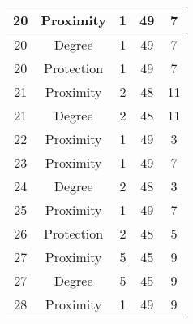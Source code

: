 \documentclass[results.tex]{subfiles}
\begin{document}
\begin{center}
\begin{tabular}{| c || c | c | c | c |}
            \hline
            20                      & Proximity                    & 1                      & 49                      & 7                    \\
            \hline
            20                      & Degree                       & 1                      & 49                      & 7                    \\
            \hline
            20                      & Protection                   & 1                      & 49                      & 7                    \\
            \hline
            21                      & Proximity                    & 2                      & 48                      & 11                   \\
            \hline
            21                      & Degree                       & 2                      & 48                      & 11                   \\
            \hline
            22                      & Proximity                    & 1                      & 49                      & 3                    \\
            \hline
            23                      & Proximity                    & 1                      & 49                      & 7                    \\
            \hline
            24                      & Degree                       & 2                      & 48                      & 3                    \\
            \hline
            25                      & Proximity                    & 1                      & 49                      & 7                    \\
            \hline
            26                      & Protection                   & 2                      & 48                      & 5                    \\
            \hline
            27                      & Proximity                    & 5                      & 45                      & 9                    \\
            \hline
            27                      & Degree                       & 5                      & 45                      & 9                    \\
            \hline
            28                      & Proximity                    & 1                      & 49                      & 9                    \\

\end{tabular}
\end{center}
\end{document}
